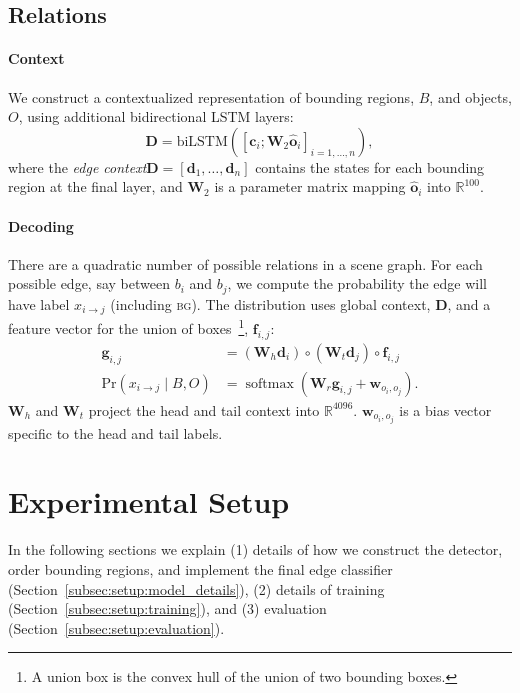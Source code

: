 \documentclass[10pt,twocolumn,letterpaper]{article}
\DeclareMathOperator*{\softmax}{softmax}
\newcommand{\p}[1]{\textrm{Pr}( #1 )}  %
\newcommand{\R}{\mathbb{R}}   %
\newcommand{\bg}{\textsc{bg}}  %
\newcommand{\term}[1]{\emph{#1}}  %
\newcommand{\vect}[1]{\mathbf{#1}}   %
\newcommand{\mat}[1]{\mathbf{#1}}    %
\begin{document}
\subsection{Relations}\label{subsec:model:relations}\paragraph{Context}
We construct a contextualized representation of bounding regions, $B$, and objects, $O$, using additional bidirectional LSTM layers:
\begin{equation}
\mat{D} = \text{biLSTM}(
  [\vect{c}_i; \mat{W}_2 \vect{\hat{o}}_i]_{i=1,\ldots,n}
),
\end{equation}
where the \term{edge context}$\mat{D} = [\vect{d}_{1}, \ldots, \vect{d}_{n}]$ contains the states for each bounding region at the final layer, and $\mat{W}_2$ is a parameter matrix mapping $\vect{\hat{o}}_i$ into $\R^{100}$.

\paragraph{Decoding}
There are a quadratic number of possible relations in a scene graph.
For each possible edge, say between $b_i$ and $b_j$, we compute the probability the edge will have label $x_{i \to j}$ (including \bg).
The distribution uses global context, $\mat{D}$, and a feature vector for the union of boxes~\footnote{A union box is the convex hull of the union of two bounding boxes.}, $\vect{f}_{i,j}$:
\begin{align}
\label{eq:hadamard}
      \vect{g}_{i, j} &= (\mat{W}_h \vect{d}_{i}) \circ (\mat{W}_t \vect{d}_{j}) \circ \vect{f}_{i, j} \\
      \p{ x_{i \to j} \mid B, O } &=
 \softmax{\left(
   \mat{W}_r \vect{g}_{i, j} + \vect{w}_{o_i,o_j}
 \right)}.
\end{align}$\mat{W}_h$ and $\mat{W}_t$ project the head and tail context into $\R^{4096}$.
$\vect{w}_{o_i,o_j}$ is a bias vector specific to the head and tail labels.
\section{Experimental Setup}
\label{sec:setup}
In the following sections we explain (1) details of how we construct the detector, order bounding regions, and implement the final edge classifier (Section~\ref{subsec:setup:model_details}), (2) details of training (Section~\ref{subsec:setup:training}), and (3) evaluation (Section~\ref{subsec:setup:evaluation}).
\end{document}
